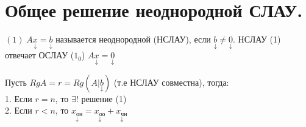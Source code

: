 \documentclass[../main.tex]{subfiles}
\begin{document}
\section{Общее решение неоднородной СЛАУ.}
\noindent $(1)\; A\underset{\downarrow}{x}=\underset{\downarrow}{b}$ называется неоднородной (НСЛАУ), если $\underset{\downarrow}{b}\neq \underset{\downarrow}{0}$.
НСЛАУ (1) отвечает ОСЛАУ ($1_{0}$) $A\underset{\downarrow}{x}=\underset{\downarrow}{0}$
\begin{theorem}
    Пусть $RgA =r = Rg(A|\underset{\downarrow}{b})$ (т.е НСЛАУ совместна), тогда:
    \\1. Если $r=n$, то $\exists !$ решение (1)
    \\2. Если $r<n$, то $\underset{\downarrow}{x_{\text{он}}}=\underset{\downarrow}{x_{\text{оо}}}+\underset{\downarrow}{x_{\text{чн}}}$

\end{theorem}
\end{document}
